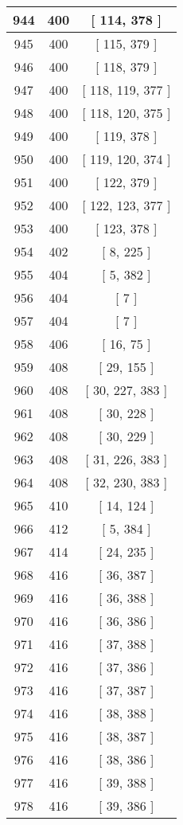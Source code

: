 \begin{center}
\begin{longtable}[H]{|| c c c ||}
\hline
944 & 400 & [ 114, 378 ] \\ 
\hline
945 & 400 & [ 115, 379 ] \\ 
\hline
946 & 400 & [ 118, 379 ] \\ 
\hline
947 & 400 & [ 118, 119, 377 ] \\ 
\hline
948 & 400 & [ 118, 120, 375 ] \\ 
\hline
949 & 400 & [ 119, 378 ] \\ 
\hline
950 & 400 & [ 119, 120, 374 ] \\ 
\hline
951 & 400 & [ 122, 379 ] \\ 
\hline
952 & 400 & [ 122, 123, 377 ] \\ 
\hline
953 & 400 & [ 123, 378 ] \\ 
\hline
954 & 402 & [ 8, 225 ] \\ 
\hline
955 & 404 & [ 5, 382 ] \\ 
\hline
956 & 404 & [ 7 ] \\ 
\hline
957 & 404 & [ 7 ] \\ 
\hline
958 & 406 & [ 16, 75 ] \\ 
\hline
959 & 408 & [ 29, 155 ] \\ 
\hline
960 & 408 & [ 30, 227, 383 ] \\ 
\hline
961 & 408 & [ 30, 228 ] \\ 
\hline
962 & 408 & [ 30, 229 ] \\ 
\hline
963 & 408 & [ 31, 226, 383 ] \\ 
\hline
964 & 408 & [ 32, 230, 383 ] \\ 
\hline
965 & 410 & [ 14, 124 ] \\ 
\hline
966 & 412 & [ 5, 384 ] \\ 
\hline
967 & 414 & [ 24, 235 ] \\ 
\hline
968 & 416 & [ 36, 387 ] \\ 
\hline
969 & 416 & [ 36, 388 ] \\ 
\hline
970 & 416 & [ 36, 386 ] \\ 
\hline
971 & 416 & [ 37, 388 ] \\ 
\hline
972 & 416 & [ 37, 386 ] \\ 
\hline
973 & 416 & [ 37, 387 ] \\ 
\hline
974 & 416 & [ 38, 388 ] \\ 
\hline
975 & 416 & [ 38, 387 ] \\ 
\hline
976 & 416 & [ 38, 386 ] \\ 
\hline
977 & 416 & [ 39, 388 ] \\ 
\hline
978 & 416 & [ 39, 386 ] \\ 

\end{longtable}
\end{center}
